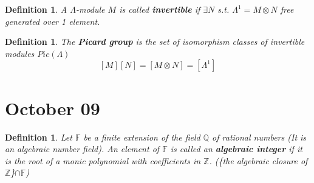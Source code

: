 \documentclass[11pt]{article}
\newtheorem{dfn}[thm]{Definition}
\newcommand{\intg}{\mathbb Z}
\newcommand{\bbf}{\mathbb F}
\newcommand{\ratl}{\mathbb Q}
\begin{document}
\begin{dfn}
A $\Lambda$-module $M$ is called \textbf{invertible} if $\exists N$ s.t. $\Lambda^1=M\otimes N$ free generated over 1 element.
\end{dfn}

\begin{dfn}The \textbf{Picard group} is the set of  isomorphism classes of invertible modules
$Pic(\Lambda)$
$$
[M][N]=[M\otimes N]=[\Lambda^1]
$$
\end{dfn}


\section{October 09}
\begin{dfn}
Let $\bbf$ be a finite extension of the field $\ratl$ of rational numbers (It is an algebraic number field). An element of $\bbf$ is called an \textbf{algebraic integer} if  it is the root of a monic polynomial with coefficients  in $\intg$. (\{the algebraic closure of $\intg$\}$\cap\bbf$)
\end{dfn}
\end{document}
